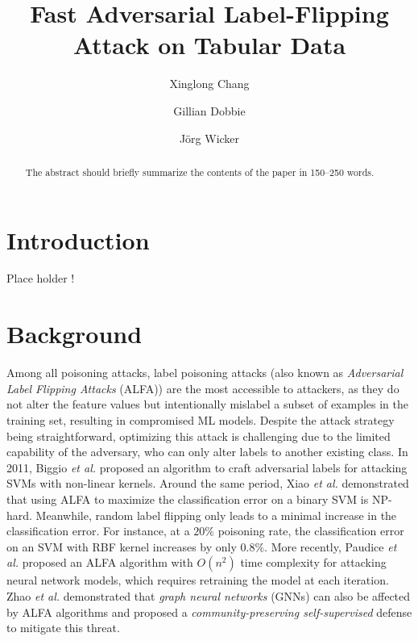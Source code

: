 \documentclass[runningheads]{llncs}
\begin{document}
%
\title{Fast Adversarial Label-Flipping Attack on Tabular Data}
%
%
\author{
    Xinglong Chang \and
    Gillian Dobbie \and
    J\"org Wicker
}
%
%
%
\maketitle              %
%
\begin{abstract}
The abstract should briefly summarize the contents of the paper in
150--250 words.

\end{abstract}


\section{Introduction}

Place holder \cite{ref_article1}!


\section{Background}
\label{sec:background}

Among all poisoning attacks, label poisoning attacks (also known as \emph{Adversarial Label Flipping Attacks} (ALFA)) are the most accessible to attackers, as they do not alter the feature values but intentionally mislabel a subset of examples in the training set, resulting in compromised ML models.
Despite the attack strategy being straightforward, optimizing this attack is challenging due to the limited capability of the adversary, who can only alter labels to another existing class.
In 2011, Biggio \emph{et al.} \cite{biggio2011support} proposed an algorithm to craft adversarial labels for attacking SVMs with non-linear kernels.
Around the same period, Xiao \emph{et al.} \cite{xiao2012adversarial} demonstrated that using ALFA to maximize the classification error on a binary SVM is NP-hard.
Meanwhile, random label flipping only leads to a minimal increase in the classification error.
For instance, at a $20\%$ poisoning rate, the classification error on an SVM with RBF kernel increases by only $0.8\%$.
More recently, Paudice \emph{et al.} \cite{paudice2018label} proposed an ALFA algorithm with $O(n^2)$ time complexity for attacking neural network models, which requires retraining the model at each iteration.
Zhao \emph{et al.} \cite{zhang2020adversarial} demonstrated that \emph{graph neural networks} (GNNs) can also be affected by ALFA algorithms and proposed a \emph{community-preserving self-supervised} defense to mitigate this threat.
\end{document}
